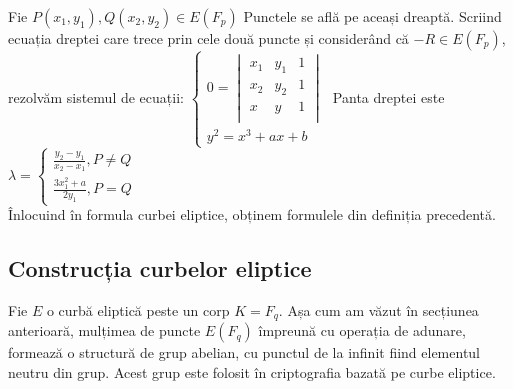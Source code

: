 \begin{dem}
Fie $P(x_1, y_1), Q(x_2, y_2)\in E(F_p)$ Punctele se află pe aceași dreaptă. Scriind ecuația dreptei care trece prin cele două puncte și considerând că $-R\in E(F_p)$, rezolvăm sistemul de ecuații:
$\begin{cases} 
    0 = \begin{vmatrix}
			x_1 & y_1 & 1 \\ 
			x_2 & y_2 & 1 \\ 
			x & y & 1  \\ 
			\end{vmatrix} \\
    y^2 =  x^3 + ax + b
   \end{cases}$
   Panta dreptei este $\lambda = \begin{cases}
 \frac{y_2 - y_1}{x_2 - x_1}, P \neq Q \\ 
 \frac{3x^{2}_1 + a}{2y_1}, P = Q
 \end{cases}$
 \\Înlocuind în formula curbei eliptice, obținem formulele din definiția precedentă.
\end{dem}

\subsection{Construcția curbelor eliptice}
\label{subsec:subsec02}

Fie $E$ o curbă eliptică peste un corp $K = F_q$. Așa cum am văzut în secțiunea anterioară, mulțimea de puncte $E(F_q)$ împreună cu operația de adunare, formează o structură de grup abelian, cu punctul de la infinit fiind elementul neutru din grup. Acest grup este folosit în criptografia bazată pe curbe eliptice.


